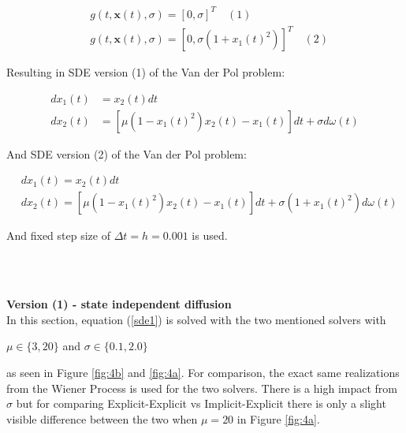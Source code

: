 \begin{align*}
    & g(t, \boldsymbol{x}(t), \sigma) = [0, \sigma]^T \quad (1) \\
    & g(t, \boldsymbol{x}(t), \sigma) = [0, \sigma (1 + x_1(t)^2)]^T \quad (2)
\end{align*}

Resulting in SDE version (1) of the Van der Pol problem:

\begin{equation}
\label{sde1}
\begin{aligned}
d x_{1}(t) &=x_{2}(t) d t \\
d x_{2}(t) &=\left[\mu\left(1-x_{1}(t)^{2}\right) x_{2}(t)-x_{1}(t)\right] d t+\sigma d \omega(t)
\end{aligned}
\end{equation}

And SDE version (2) of the Van der Pol problem:

\begin{equation}
\label{sde2}
\begin{aligned}
&d x_{1}(t)=x_{2}(t) d t \\
&d x_{2}(t)=\left[\mu\left(1-x_{1}(t)^{2}\right) x_{2}(t)-x_{1}(t)\right] d t+\sigma\left(1+x_{1}(t)^{2}\right) d \omega(t)
\end{aligned}
\end{equation}

And fixed step size of $\Delta t = h = 0.001$ is used.







\\\

\textbf{Version (1) - state independent diffusion}\\
In this section, equation (\ref{sde1}) is solved with the two mentioned solvers with \\
\begin{center}
    $\mu \in \{3, 20\}$ and $\sigma \in \{0.1, 2.0\}$
\end{center}
as seen in Figure \ref{fig:4b} and \ref{fig:4a}. For comparison, the exact same realizations from the Wiener Process is used for the two solvers. There is a high impact from $\sigma$ but for comparing Explicit-Explicit vs Implicit-Explicit there is only a slight visible difference between the two when $\mu = 20$ in Figure \ref{fig:4a}.


